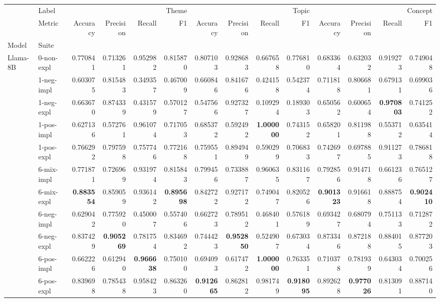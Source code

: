 \begin{tabular}{ll|rrrr|rrrr|rrrr}
 & Label & \multicolumn{4}{r}{Theme} & \multicolumn{4}{r}{Topic} & \multicolumn{4}{r}{Concept} \\
 & Metric & Accuracy & Precision & Recall & F1 & Accuracy & Precision & Recall & F1 & Accuracy & Precision & Recall & F1 \\
Model & Suite &  &  &  &  &  &  &  &  &  &  &  &  \\
\midrule
\multirow[c]{11}{*}{Llama-8B} & 0-non-expl & 0.770841 & 0.713261 & 0.952982 & 0.815870 & 0.807103 & 0.928683 & 0.667658 & 0.776810 & 0.683364 & 0.632032 & 0.919273 & 0.749048 \\
 & 1-neg-impl & 0.603075 & 0.815483 & 0.349357 & 0.467009 & 0.660846 & 0.841676 & 0.424158 & 0.542374 & 0.711818 & 0.806681 & 0.679131 & 0.699036 \\
 & 1-neg-expl & 0.663670 & 0.874339 & 0.431579 & 0.570127 & 0.547566 & 0.927327 & 0.109294 & 0.189303 & 0.650562 & 0.600654 & \bfseries 0.970803 & 0.741252 \\
 & 1-pos-impl & 0.627136 & 0.572761 & 0.961074 & 0.717053 & 0.685372 & 0.592492 & \bfseries 1.000000 & 0.743152 & 0.658201 & 0.811988 & 0.553712 & 0.635414 \\
 & 1-pos-expl & 0.766292 & 0.797598 & 0.757746 & 0.772168 & 0.759551 & 0.894949 & 0.590299 & 0.706833 & 0.742697 & 0.697885 & 0.911273 & 0.786818 \\
 & 6-mix-impl & 0.771871 & 0.726969 & 0.931974 & 0.815843 & 0.799456 & 0.733887 & 0.960635 & 0.831167 & 0.792856 & 0.914718 & 0.661236 & 0.765127 \\
 & 6-mix-expl & \bfseries 0.883554 & 0.859059 & 0.936142 & \bfseries 0.895698 & 0.842722 & 0.927172 & 0.749047 & 0.820526 & \bfseries 0.901323 & 0.916618 & 0.888754 & \bfseries 0.902410 \\
 & 6-neg-impl & 0.629042 & 0.775920 & 0.450007 & 0.557406 & 0.662723 & 0.789512 & 0.468401 & 0.576189 & 0.693427 & 0.680794 & 0.751133 & 0.712872 \\
 & 6-neg-expl & 0.837429 & \bfseries 0.905269 & 0.781754 & 0.834692 & 0.744423 & \bfseries 0.952850 & 0.524907 & 0.673034 & 0.873346 & 0.872188 & 0.884015 & 0.877203 \\
 & 6-pos-impl & 0.662226 & 0.612940 & \bfseries 0.966638 & 0.750100 & 0.694093 & 0.617472 & \bfseries 1.000000 & 0.763351 & 0.710378 & 0.781939 & 0.643034 & 0.700256 \\
 & 6-pos-expl & 0.839698 & 0.785438 & 0.958423 & 0.863260 & \bfseries 0.912665 & 0.862812 & 0.981749 & \bfseries 0.918095 & 0.892628 & \bfseries 0.977026 & 0.813091 & 0.887140 \\

\end{tabular}
